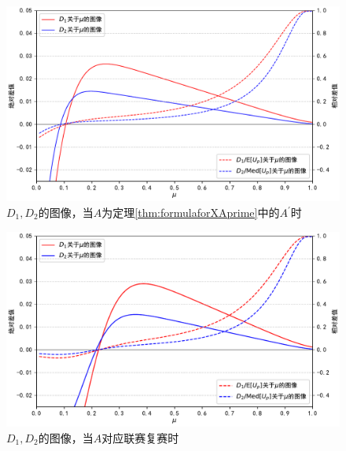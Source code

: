             \begin{figure}[htbp]
                \centering
                \includegraphics[width=\textwidth]{fig/plottingD_1D_2.pdf}
                \caption{$D_1,D_2$的图像，当$A$为定理\ref{thm:formulaforXAprime}中的$A^\prime$时}
                \label{fig:plottingD_1D_2forAprime}
            \end{figure}

            \begin{figure}[htbp]
                \centering
                \includegraphics[width=\textwidth]{fig/plottingNoipD_1D_2.pdf}
                \caption{$D_1,D_2$的图像，当$A$对应联赛复赛时}
                \label{fig:plottingD_1D_2forNoip}
            \end{figure}

